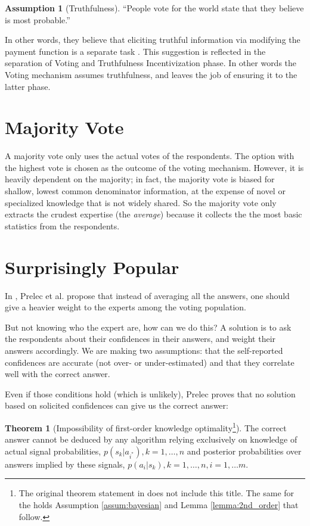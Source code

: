 \documentclass{report}
\theoremstyle{definition}
\newtheorem{assumption}{Assumption}
\newtheorem{theorem}{Theorem}
\begin{document}
\begin{assumption}[Truthfulness]
\label{assum:truthfulness}
``People vote for the world state that they believe is most probable.''
\end{assumption}

 In other words, they believe that eliciting truthful information via modifying the payment function is a separate task . This suggestion is reflected in the separation of Voting and Truthfulness Incentivization phase. In other words the Voting mechanism assumes truthfulness, and leaves the job of ensuring it to the latter phase.
 
 
 \section{Majority Vote}
 A majority vote only uses the actual votes of the respondents. The option with the highest vote is chosen as the outcome of the voting mechanism. However, it is heavily dependent on the majority; in fact, the majority vote is biased for shallow, lowest common denominator information, at the expense of novel or specialized knowledge that is not widely shared.\cite{prelec:nature, chen, lorenz} So the majority vote only extracts the crudest expertise (the \emph{average}) because it collects the the most basic statistics from the respondents.
 



\section{Surprisingly Popular}
In \cite{prelec:nature}, Prelec et al. propose that instead of averaging all the answers, one should give a heavier weight to the experts among the voting population. 

But not knowing who the expert are, how can we do this?
A solution is to ask the respondents about their confidences in their answers, and weight their answers accordingly. We are making two assumptions: that the self-reported confidences are accurate (not over- or under-estimated) and that they correlate well with the correct answer.

Even if those conditions hold (which is unlikely), Prelec proves that no solution based on solicited confidences can give us the correct answer: \cite[Supplementary Information (SI)]{prelec:nature}


\begin{theorem}[Impossibility of first-order knowledge optimality\footnote{The original theorem statement in \cite{prelec:nature} does not include this title. The same for the holds Assumption \ref{assum:bayesian} and Lemma \ref{lemma:2nd_order} that follow.}]
\label{thm:imposibility}
The correct answer cannot be deduced by any algorithm relying exclusively on knowledge of actual signal probabilities, $p(s_k |a_{i^*}), k = 1,\dots ,n$ and posterior probabilities over answers implied by these signals, $p(a_i|s_k), k = 1,\dots, n, i = 1,\dots m$.
\end{theorem}
\end{document}
